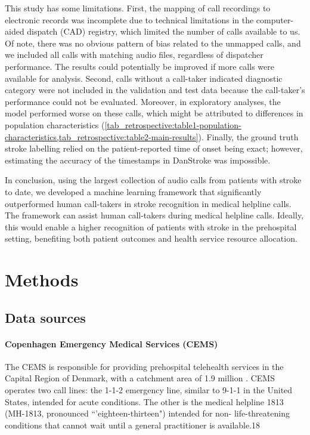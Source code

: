 {This study has some limitations. First, the mapping of call recordings to electronic records was incomplete due to technical limitations in the computer-aided dispatch (CAD) registry, which limited the number of calls available to us. Of note, there was no obvious pattern of bias related to the unmapped calls, and we included all calls with matching audio files, regardless of dispatcher performance. The results could potentially be improved if more calls were available for analysis. Second, calls without a call-taker indicated diagnostic category were not included in the validation and test data because the call-taker's performance could not be evaluated. Moreover, in exploratory analyses, the model performed worse on these calls, which might be attributed to differences in population characteristics (\cref{tab_retrospective:table1-population-characteristics,tab_retrospective:table2-main-results}). Finally, the ground truth stroke labelling relied on the patient-reported time of onset being exact; however, estimating the accuracy of the timestamps in DanStroke was impossible.

In conclusion, using the largest collection of audio calls from patients with stroke to date, we developed a machine learning framework that significantly outperformed human call-takers in stroke recognition in medical helpline calls. The framework can assist human call-takers during medical helpline calls. Ideally, this would enable a higher recognition of patients with stroke in the prehospital setting, benefiting both patient outcomes and health service resource allocation.


\section{Methods}

\subsection{Data sources}

\paragraph{Copenhagen Emergency Medical Services (CEMS)}

The CEMS is responsible for providing prehospital telehealth services in the Capital Region of Denmark, with a catchment area of 1.9 million \parencite{cite17}. CEMS operates two call lines: the 1-1-2 emergency line, similar to 9-1-1 in the United States, intended for acute conditions. The other is the medical helpline 1813 (MH-1813, pronounced ``'eighteen-thirteen") intended for non- life-threatening conditions that cannot wait until a general practitioner is available.18

}
